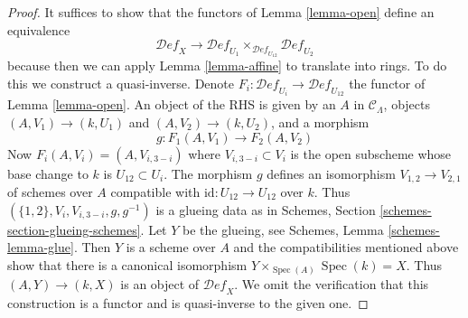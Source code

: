 \documentclass[10pt,a4paper]{amsart}
\theoremstyle{plain}
\theoremstyle{definition}
\theoremstyle{remark}
\numberwithin{equation}{subsection}
\def\Spec{\mathop{\mathrm{Spec}}}
\def\Deformationcategory{\mathcal{D}\!\mathit{ef}}
\begin{document}
\begin{proof}
It suffices to show that the functors of Lemma \ref{lemma-open}
define an equivalence
$$
\Deformationcategory_X \longrightarrow
\Deformationcategory_{U_1}
\times_{\Deformationcategory_{U_{12}}}
\Deformationcategory_{U_2}
$$
because then we can apply Lemma \ref{lemma-affine} to translate into rings.
To do this we construct a quasi-inverse. Denote
$F_i : \Deformationcategory_{U_i} \to \Deformationcategory_{U_{12}}$
the functor of Lemma \ref{lemma-open}.
An object of the RHS is given by an $A$ in $\mathcal{C}_\Lambda$,
objects $(A, V_1) \to (k, U_1)$ and $(A, V_2) \to (k, U_2)$, and
a morphism
$$
g : F_1(A, V_1) \to F_2(A, V_2)
$$
Now $F_i(A, V_i) = (A, V_{i, 3 - i})$ where $V_{i, 3 - i} \subset V_i$
is the open subscheme whose base change to $k$ is $U_{12} \subset U_i$.
The morphism $g$ defines an isomorphism
$V_{1, 2} \to V_{2, 1}$ of schemes over $A$ compatible
with $\text{id} : U_{12} \to U_{12}$ over $k$.
Thus $(\{1, 2\}, V_i, V_{i, 3 - i}, g, g^{-1})$ is a glueing
data as in Schemes, Section \ref{schemes-section-glueing-schemes}.
Let $Y$ be the glueing, see Schemes, Lemma \ref{schemes-lemma-glue}.
Then $Y$ is a scheme over $A$ and the
compatibilities mentioned above show that
there is a canonical isomorphism
$Y \times_{\Spec(A)} \Spec(k) = X$.
Thus $(A, Y) \to (k, X)$ is an object of $\Deformationcategory_X$.
We omit the verification that this construction is a functor
and is quasi-inverse to the given one.
\end{proof}
\end{document}
